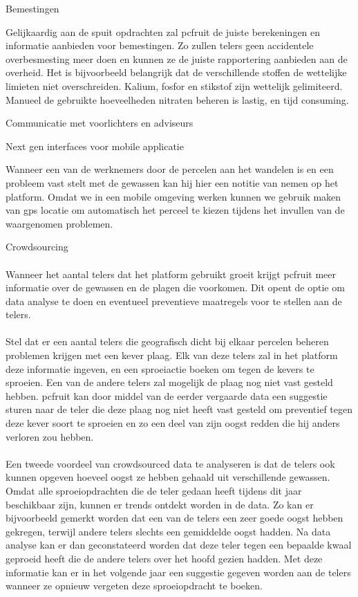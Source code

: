 Bemestingen

Gelijkaardig aan de spuit opdrachten zal pcfruit de juiste berekeningen en informatie
aanbieden voor bemestingen. Zo zullen telers geen accidentele overbesmesting meer doen en
kunnen ze de juiste rapportering aanbieden aan de overheid. Het is bijvoorbeeld
belangrijk dat de verschillende stoffen de wettelijke limieten niet overschreiden.
Kalium, fosfor en stikstof zijn wettelijk gelimiteerd. Manueel de gebruikte hoeveelheden
nitraten beheren is lastig, en tijd consuming.

Communicatie met voorlichters en adviseurs

Next gen interfaces voor mobile applicatie

Wanneer een van de werknemers door de percelen aan het wandelen is en een probleem vast
stelt met de gewassen kan hij hier een notitie van nemen op het platform. Omdat we in een
mobile omgeving werken kunnen we gebruik maken van gps locatie om automatisch het perceel
te kiezen tijdens het invullen van de waargenomen problemen.

Crowdsourcing

\paragraph {} Wanneer het aantal telers dat het platform gebruikt groeit krijgt pcfruit
meer informatie over de gewassen en de plagen die voorkomen. Dit opent de optie om data
analyse te doen en eventueel preventieve maatregels voor te stellen aan de telers.

\paragraph {} Stel dat er een aantal telers die geografisch dicht bij elkaar percelen
beheren problemen krijgen met een kever plaag. Elk van deze telers zal in het platform
deze informatie ingeven, en een sproeiactie boeken om tegen de kevers te sproeien. Een van
de andere telers zal mogelijk de plaag nog niet vast gesteld hebben. pcfruit kan door
middel van de eerder vergaarde data een suggestie sturen naar de teler die deze plaag nog
niet heeft vast gesteld om preventief tegen deze kever soort te sproeien en zo een deel
van zijn oogst redden die hij anders verloren zou hebben.

\paragraph {} Een tweede voordeel van crowdsourced data te analyseren is dat de telers ook
kunnen opgeven hoeveel oogst ze hebben gehaald uit verschillende gewassen. Omdat alle
sproeiopdrachten die de teler gedaan heeft tijdens dit jaar beschikbaar zijn, kunnen er
trends ontdekt worden in de data. Zo kan er bijvoorbeeld gemerkt worden dat een van de
telers een zeer goede oogst hebben gekregen, terwijl andere telers slechts een gemiddelde
oogst hadden. Na data analyse kan er dan geconstateerd worden dat deze teler tegen een
bepaalde kwaal geproeid heeft die de andere telers over het hoofd gezien hadden. Met deze
informatie kan er in het volgende jaar een suggestie gegeven worden aan de telers wanneer
ze opnieuw vergeten deze sproeiopdracht te boeken.

